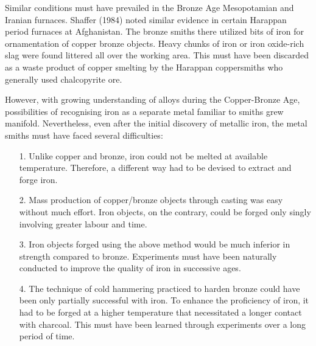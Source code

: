 Similar conditions must have prevailed in the Bronze Age Mesopotamian and Iranian furnaces. Shaffer (1984) noted similar evidence in certain Harappan period furnaces at Afghanistan. The bronze smiths there utilized bits of iron for ornamentation of copper bronze objects. Heavy chunks of iron or iron oxide-rich slag were found littered all over the working area. This must have been discarded as a waste product of copper smelting by the Harappan coppersmiths who generally used chalcopyrite ore.

However, with growing understanding of alloys during the Copper-Bronze Age, possibilities of recognising iron as a separate metal familiar to smiths grew manifold. Nevertheless, even after the initial discovery of metallic iron, the metal smiths must have faced several difficulties:
\begin{itemize}
\item[1.] Unlike copper and bronze, iron could not be melted at available temperature. Therefore, a different way had to be devised to extract and forge iron.

\item[2.] Mass production of copper/bronze objects through casting was easy without much effort. Iron objects, on the contrary, could be forged only singly involving greater labour and time.

\item[3.] Iron objects forged using the above method would be much inferior in strength compared to bronze. Experiments must have been naturally conducted to improve the quality of iron in successive ages.

\item[4.] The technique of cold hammering practiced to harden bronze could have been only partially successful with iron. To enhance the proficiency of iron, it had to be forged at a higher temperature that necessitated a longer contact with charcoal. This must have been learned through experiments over a long period of time. 
\end{itemize}

